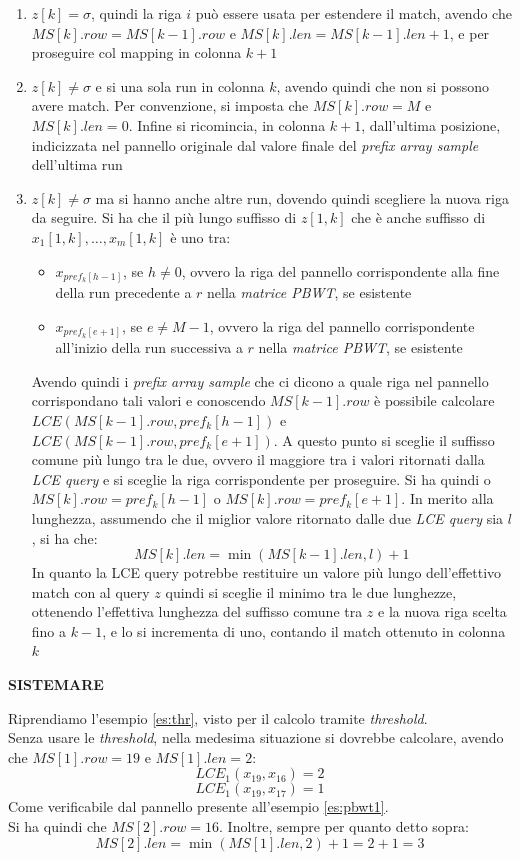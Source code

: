 \begin{enumerate}
  \item $z[k]=\sigma$, quindi la riga $i$ può essere usata per estendere il
  match, avendo che $MS[k].row=MS[k-1].row$ e $MS[k].len=MS[k-1].len+1$, e per
  proseguire col mapping in colonna $k+1$
  \item $z[k]\neq\sigma$ e si una sola run in colonna $k$, avendo quindi che non
  si possono avere match. Per convenzione, si
  imposta che $MS[k].row = M$ e $MS[k].len=0$. Infine si ricomincia, in colonna
  $k+1$, dall'ultima posizione, indicizzata nel pannello originale dal valore
  finale del \textit{prefix array sample} dell'ultima run
  \item $z[k]\neq\sigma$ ma si hanno anche altre run, dovendo quindi scegliere
  la nuova riga da seguire. Si ha che il più lungo suffisso di $z[1,k]$ che è
  anche suffisso di $x_1[1,k],\ldots, x_m[1,k]$ è uno tra:
  \begin{itemize}
    \item $x_{pref_k[h-1]}$, se $h\neq 0$, ovvero la riga del pannello
    corrispondente alla fine della run precedente a $r$ nella \textit{matrice
      PBWT}, se esistente
    \item $x_{pref_k[e+1]}$, se $e\neq M-1$, ovvero la riga del pannello
    corrispondente all'inizio della run successiva a $r$ nella \textit{matrice
      PBWT}, se esistente
  \end{itemize}
  Avendo quindi i \textit{prefix array sample} che ci dicono a quale riga nel
  pannello corrispondano tali valori e conoscendo $MS[k-1].row$ è possibile
  calcolare $LCE(MS[k-1].row, pref_k[h-1])$ e $LCE(MS[k-1].row, pref_k[e+1])$. A
  questo punto si sceglie il suffisso comune più lungo tra le due, ovvero il
  maggiore tra i valori ritornati dalla \textit{LCE query} e si sceglie la riga
  corrispondente per proseguire. Si ha quindi o $MS[k].row=pref_k[h-1]$ o
  $MS[k].row=pref_k[e+1]$. In merito alla lunghezza, assumendo che il miglior
  valore ritornato dalle due \textit{LCE query} sia $l$, si ha che:
  \[MS[k].len=\min(MS[k-1].len, l)+1\]
  In quanto la LCE query potrebbe restituire un valore più lungo dell'effettivo
  match con al query $z$ quindi si sceglie il minimo tra le due lunghezze,
  ottenendo l'effettiva lunghezza del suffisso comune tra $z$ e la nuova riga
  scelta fino a $k-1$, e lo si 
  incrementa di uno, contando il match ottenuto in colonna $k$
\end{enumerate}
\textbf{SISTEMARE}
\begin{esempio}
  Riprendiamo l'esempio \ref{es:thr}, visto per il calcolo
  tramite \textit{threshold}. \\
  Senza usare le \textit{threshold}, nella medesima situazione si dovrebbe
  calcolare, avendo che $MS[1].row=19$ e $MS[1].len =2$:
  \[LCE_1(x_{19}, x_{16})=2\]
  \[LCE_1(x_{19}, x_{17})=1\]
  Come verificabile dal pannello presente all'esempio \ref{es:pbwt1}.\\
  Si ha quindi che $MS[2].row=16$. Inoltre, sempre per quanto detto sopra:
  \[MS[2].len=\min(MS[1].len, 2)+1=2+1=3\]
\end{esempio}
